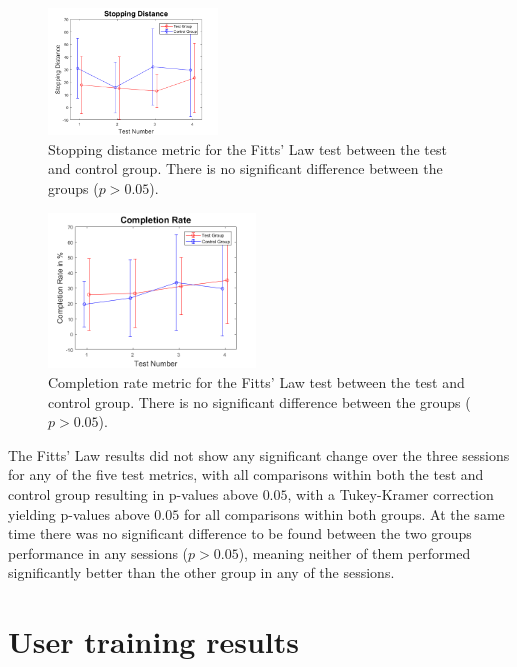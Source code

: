 \begin{figure}[H] 
	\includegraphics[width=0.4\textwidth]{figures/xWesulds/StoppingDistance}
	\caption{Stopping distance metric for the Fitts' Law test between the test and control group. There is no significant difference between the groups ($p > 0.05$).}
	\label{fig:SDresult}
\end{figure} 

\begin{figure}[H] 
	\includegraphics[width=0.49\textwidth]{figures/xWesulds/CompletionRate}
	\caption{Completion rate metric for the Fitts' Law test between the test and control group. There is no significant difference between the groups ($p > 0.05$).}
	\label{fig:CRresult}
\end{figure} 

The Fitts' Law results did not show any significant change over the three sessions for any of the five test metrics, with all comparisons within both the test and control group resulting in p-values above $0.05$, with a Tukey-Kramer correction yielding p-values above $0.05$ for all comparisons within both groups. At the same time there was no significant difference to be found between the two groups performance in any sessions ($p > 0.05$), meaning neither of them performed significantly better than the other group in any of the sessions.

\section{User training results} \label{sec:R:userTraining}

